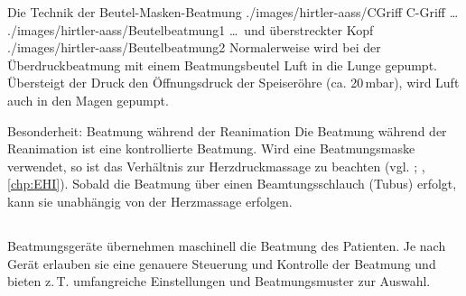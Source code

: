 \begin{PictureSeriesWide}{}{Die Technik der Beutel-Masken-Beatmung }
{./images/hirtler-aass/CGriff}
{C-Griff \ldots}
{./images/hirtler-aass/Beutelbeatmung1}
{\ldots\ und überstreckter Kopf}
{./images/hirtler-aass/Beutelbeatmung2}
{Normalerweise wird bei der Überdruckbeatmung mit einem
Beatmungsbeutel Luft in die Lunge gepumpt. Übersteigt der
Druck den Öffnungsdruck der Speiseröhre (ca.
20\,{\FontUnits mbar}), wird Luft auch in den Magen gepumpt.
}
{}
{}
\end{PictureSeriesWide}



\Text
{Besonderheit: Beatmung während der
Reanimation}
{Die Beatmung während der Reanimation ist eine kontrollierte
Beatmung. Wird eine Beatmungsmaske verwendet, so ist das
Verhältnis zur Herzdruckmassage zu beachten (vgl.
; , \ref{chp:EHI}). Sobald
die Beatmung über einen Beamtungsschlauch (Tubus) erfolgt,
kann sie unabhängig von der Herzmassage erfolgen.}
{}
{}
{}
{}










\subsection{}
\label{topic:beatmungsgeraete}

{%
Beatmungsgeräte übernehmen maschinell die Beatmung des Patienten. Je nach Gerät erlauben sie eine genauere Steuerung und Kontrolle der Beatmung und bieten z.\,T. umfangreiche Einstellungen und Beatmungsmuster zur Auswahl.%
}

